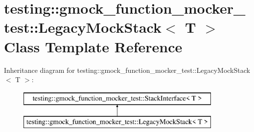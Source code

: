 \hypertarget{classtesting_1_1gmock__function__mocker__test_1_1LegacyMockStack}{}\section{testing\+:\+:gmock\+\_\+function\+\_\+mocker\+\_\+test\+:\+:Legacy\+Mock\+Stack$<$ T $>$ Class Template Reference}
\label{classtesting_1_1gmock__function__mocker__test_1_1LegacyMockStack}
Inheritance diagram for testing\+:\+:gmock\+\_\+function\+\_\+mocker\+\_\+test\+:\+:Legacy\+Mock\+Stack$<$ T $>$\+:\begin{figure}[H]
\begin{center}
\leavevmode
\includegraphics[height=2.000000cm]{classtesting_1_1gmock__function__mocker__test_1_1LegacyMockStack}
\end{center}
\end{figure}
